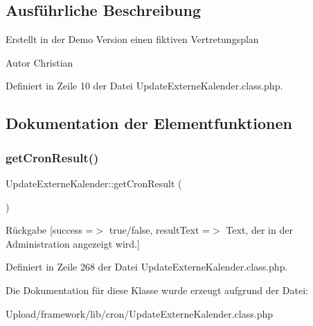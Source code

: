 \subsection{Ausführliche Beschreibung}
Erstellt in der Demo Version einen fiktiven Vertretungsplan \begin{DoxyAuthor}{Autor}
Christian 
\end{DoxyAuthor}


Definiert in Zeile 10 der Datei Update\+Externe\+Kalender.\+class.\+php.



\subsection{Dokumentation der Elementfunktionen}
\mbox{\label{class_update_externe_kalender_a139a9b026de6d9c9ea763336a06f8f1f}} 
\subsubsection{\texorpdfstring{get\+Cron\+Result()}{getCronResult()}}
{\footnotesize\ttfamily Update\+Externe\+Kalender\+::get\+Cron\+Result (\begin{DoxyParamCaption}{ }\end{DoxyParamCaption})}

\begin{DoxyReturn}{Rückgabe}
\mbox{[}\textquotesingle{}success\textquotesingle{} =$>$ \textquotesingle{}true/false\textquotesingle{}, \textquotesingle{}result\+Text\textquotesingle{} =$>$ \textquotesingle{}Text, der in der Administration angezeigt wird.\textquotesingle{}\mbox{]} 
\end{DoxyReturn}


Definiert in Zeile 268 der Datei Update\+Externe\+Kalender.\+class.\+php.



Die Dokumentation für diese Klasse wurde erzeugt aufgrund der Datei\+:\begin{DoxyCompactItemize}
\item 
Upload/framework/lib/cron/Update\+Externe\+Kalender.\+class.\+php\end{DoxyCompactItemize}
